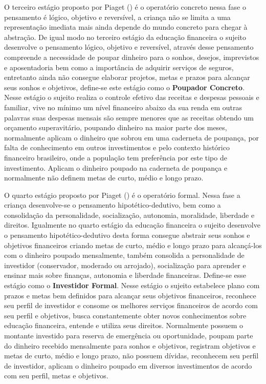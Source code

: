 O terceiro estágio proposto por Piaget (\citeyear{piaget1971}) é o operatório concreto nessa fase o pensamento é lógico, objetivo e reversível, a criança não se limita a uma representação imediata mais ainda depende do mundo concreto para chegar à abstração. De igual modo no terceiro estágio da educação financeira o sujeito desenvolve o pensamento lógico, objetivo e reversível, através desse pensamento compreende a necessidade de poupar dinheiro para o sonhos, desejos, imprevistos e aposentadoria bem como a importância de adquirir serviços de seguros, entretanto ainda não consegue elaborar projetos, metas e prazos para alcançar seus sonhos e objetivos, define-se este estágio como o \textbf{Poupador Concreto}. Nesse estágio o sujeito realiza o controle efetivo das receitas e despesas pessoais e familiar, vive no mínimo um nível financeiro abaixo da sua renda em outras palavras suas despesas mensais são sempre menores que as receitas obtendo um orçamento superavitário, poupando dinheiro na maior parte dos meses, normalmente aplicam o dinheiro que sobrou em uma caderneta de poupança, por falta de conhecimento em outros investimentos e pelo contexto histórico financeiro brasileiro, onde a população tem preferência por este tipo de investimento. Aplicam o dinheiro poupado na caderneta de poupança e normalmente não definem metas de curto, médio e longo prazo.

O quarto estágio proposto por Piaget (\citeyear{piaget1971}) é o operatório formal. Nessa fase a criança desenvolve-se o pensamento hipotético-dedutivo, bem como a consolidação da personalidade, socialização, autonomia, moralidade, liberdade e direitos. Igualmente no quarto estágio da educação financeira o sujeito desenvolve o pensamento hipotético-dedutivo desta forma consegue abstrair seus sonhos e objetivos financeiros criando metas de curto, médio e longo prazo para alcançá-los com o dinheiro poupado mensalmente, também consolida a personalidade de investidor (conservador, moderado ou arrojado), socialização para aprender e ensinar mais sobre finanças, autonomia e liberdade financeiras. Define-se esse estágio como o \textbf{Investidor Formal}. Nesse estágio o sujeito estabelece plano com prazos e metas bem definidos para alcançar seus objetivos financeiros, reconhece seu perfil de investidor e consome os melhores serviços financeiros de acordo com seu perfil e objetivos, busca constantemente obter novos conhecimentos sobre educação financeira, entende e utiliza seus direitos. Normalmente possuem o montante investido para reserva de emergência ou oportunidade, poupam parte do dinheiro recebido mensalmente para sonhos e objetivos, registram objetivos e metas de curto, médio e longo prazo, não possuem dívidas, reconhecem seu perfil de investidor, aplicam o dinheiro poupado em diversos investimentos de acordo com seu perfil, metas e objetivos.

